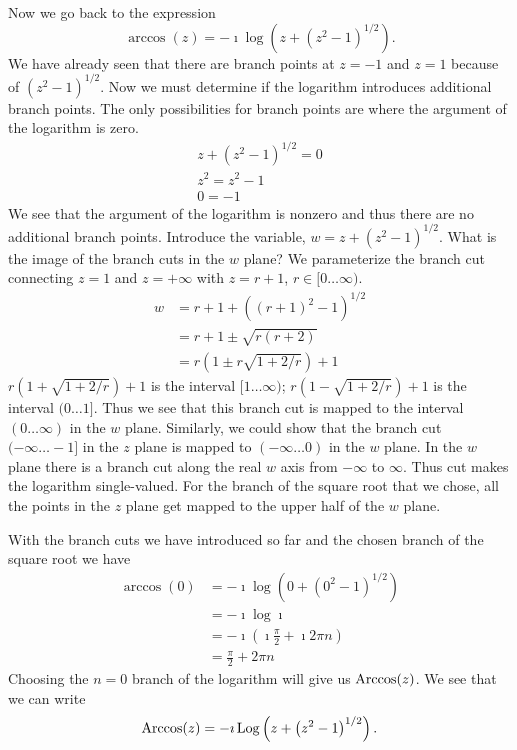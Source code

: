 {\begin{Solution}
  Now we go back to the expression
  \[
  \arccos(z) = - \imath \log\left( z + \left( z^2 - 1 \right)^{1/2} \right).
  \]
  We have already seen that there are branch points at $z = -1$ and $z = 1$
  because of $\left( z^2 - 1 \right)^{1/2}$.  Now we must determine if 
  the logarithm 
  introduces additional branch points.  The only possibilities for branch
  points are where the argument of the logarithm is zero.
  \begin{gather*}
    z + \left( z^2 - 1 \right)^{1/2} = 0 
    \\
    z^2 = z^2 - 1 
    \\
    0 = -1
  \end{gather*}
  We see that the argument of the logarithm is nonzero and thus there are no
  additional branch points.  Introduce the variable, 
  $w = z + \left( z^2 - 1 \right)^{1/2}$.
  What is the image of the branch cuts in the $w$ plane?  We parameterize
  the branch cut connecting $z = 1$ and $z = +\infty$ with $z = r + 1$, 
  $r \in [0 \ldots \infty)$.
  \begin{align*}
    w &= r + 1 + \left( (r+1)^2 - 1 \right)^{1/2} 
    \\
    &= r + 1 \pm \sqrt{r (r+2)} 
    \\
    &= r \left( 1 \pm r \sqrt{1 + 2/r} \right) + 1
  \end{align*}
  $r \left( 1 + \sqrt{1+2/r} \right) + 1$ is the interval $[1 \ldots \infty)$; 
  $r \left( 1 - \sqrt{1+2/r} \right) + 1$ is the interval $(0 \ldots 1]$. 
  Thus we see that this branch cut is mapped to the interval $(0 \ldots \infty)$
  in the $w$ plane.  Similarly, we could show that the branch cut 
  $(-\infty \ldots -1]$ in the $z$ plane is mapped to $(-\infty \ldots 0)$ in the $w$
  plane.  In the $w$ plane there is a branch cut along the real $w$ axis 
  from $-\infty$ to $\infty$.  Thus cut makes the logarithm single-valued.
  For the branch of the square root that we chose, all the points
  in the $z$ plane get mapped to the upper half of the $w$ plane.

  With the branch cuts we have introduced so far
  and the chosen branch of the square root we have
  \begin{align*}
    \arccos(0) &= - \imath \log\left( 0 + \left( 0^2 - 1 \right)^{1/2} \right) 
    \\
    &= - \imath \log \imath 
    \\
    &= - \imath \left( \imath \frac{\pi}{2} + \imath 2 \pi n \right) 
    \\
    &= \frac{\pi}{2} + 2 \pi n
  \end{align*}
  Choosing the $n = 0$ branch of the logarithm will give us $\mathop{\mathrm{Arccos}}\nolimits(z)$.
  We see that we can write
  \[
  \mathop{\mathrm{Arccos}}\nolimits(z) = - \imath \mathop{\mathrm{Log}}\nolimits\left( z + \left(z^2 - 1 \right)^{1/2} \right).
  \]
\end{Solution}
}












